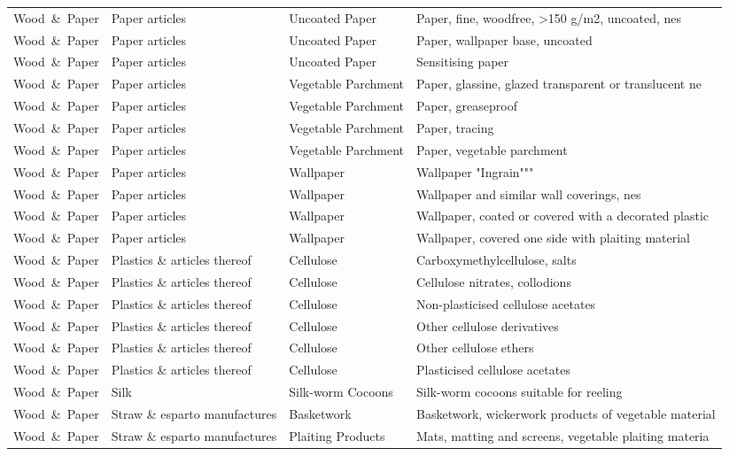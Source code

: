 \begin{appendices}
\begin{xltabular}{\textwidth}{|p{0.10\textwidth}|p{0.25\textwidth}|p{0.20\textwidth}|p{0.35\textwidth}|}
			Wood\ \&\ Paper & Paper articles & Uncoated Paper & Paper, fine, woodfree, >150 g/m2, uncoated, nes \\
			Wood\ \&\ Paper & Paper articles & Uncoated Paper & Paper, wallpaper base, uncoated \\
			Wood\ \&\ Paper & Paper articles & Uncoated Paper & Sensitising paper \\
			Wood\ \&\ Paper & Paper articles & Vegetable Parchment & Paper, glassine, glazed transparent or translucent ne \\
			Wood\ \&\ Paper & Paper articles & Vegetable Parchment & Paper, greaseproof \\
			Wood\ \&\ Paper & Paper articles & Vegetable Parchment & Paper, tracing \\
			Wood\ \&\ Paper & Paper articles & Vegetable Parchment & Paper, vegetable parchment \\
			Wood\ \&\ Paper & Paper articles & Wallpaper & Wallpaper "Ingrain""" \\
			Wood\ \&\ Paper & Paper articles & Wallpaper & Wallpaper and similar wall coverings, nes \\
			Wood\ \&\ Paper & Paper articles & Wallpaper & Wallpaper, coated or covered with a decorated plastic \\
			Wood\ \&\ Paper & Paper articles & Wallpaper & Wallpaper, covered one side with plaiting material \\
			Wood\ \&\ Paper & Plastics \& articles thereof & Cellulose & Carboxymethylcellulose, salts \\
			Wood\ \&\ Paper & Plastics \& articles thereof & Cellulose & Cellulose nitrates, collodions \\
			Wood\ \&\ Paper & Plastics \& articles thereof & Cellulose & Non-plasticised cellulose acetates \\
			Wood\ \&\ Paper & Plastics \& articles thereof & Cellulose & Other cellulose derivatives \\
			Wood\ \&\ Paper & Plastics \& articles thereof & Cellulose & Other cellulose ethers \\
			Wood\ \&\ Paper & Plastics \& articles thereof & Cellulose & Plasticised cellulose acetates \\
			Wood\ \&\ Paper & Silk & Silk-worm Cocoons & Silk-worm cocoons suitable for reeling \\
			Wood\ \&\ Paper & Straw \& esparto manufactures & Basketwork & Basketwork, wickerwork products of vegetable material \\
			Wood\ \&\ Paper & Straw \& esparto manufactures & Plaiting Products & Mats, matting and screens, vegetable plaiting materia \\

\end{xltabular}
\end{appendices}
